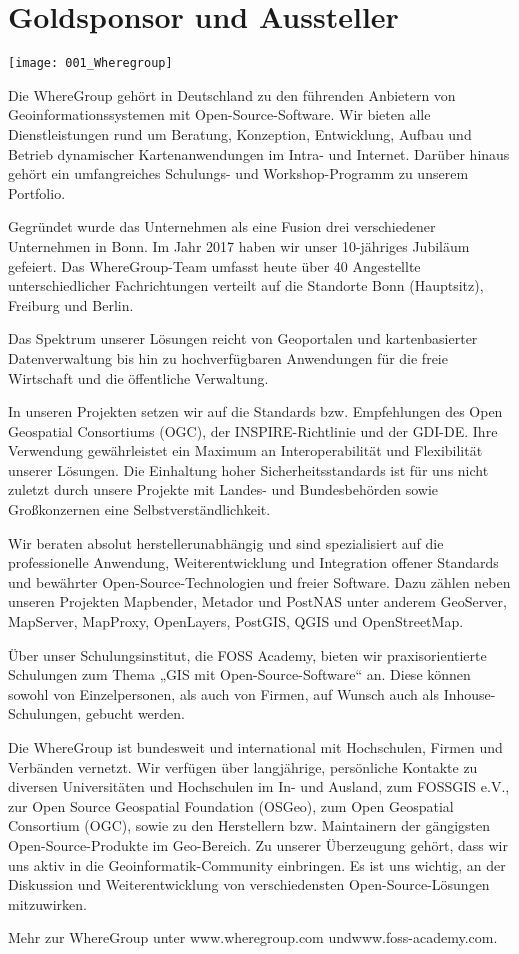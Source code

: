 \section*{Goldsponsor und Aussteller}
\begin{center}
	\texttt{[image: 001\_Wheregroup]}
\end{center}
Die WhereGroup gehört in Deutschland zu den führenden Anbietern von Geoinformationssystemen mit
Open-Source-Software. Wir bieten alle Dienstleistungen rund um Beratung, Konzeption, Entwicklung,
Aufbau und Betrieb dynamischer Kartenanwendungen im Intra- und Internet. Darüber hinaus gehört ein
umfangreiches Schulungs- und Workshop-Programm zu unserem Portfolio.

Gegründet wurde das Unternehmen als eine Fusion drei verschiedener Unternehmen in Bonn. Im Jahr 2017
haben wir unser 10-jähriges Jubiläum gefeiert. Das WhereGroup-Team umfasst heute über 40 Angestellte
unterschiedlicher Fachrichtungen verteilt auf die Standorte Bonn (Hauptsitz), Freiburg und Berlin.

Das Spektrum unserer Lösungen reicht von Geoportalen und kartenbasierter Datenverwaltung bis hin zu
hochverfügbaren Anwendungen für die freie Wirtschaft und die öffentliche Verwaltung.

In unseren Projekten setzen wir auf die Standards bzw. Empfehlungen des Open Geospatial Consortiums
(OGC), der INSPIRE-Richtlinie und der GDI-DE. Ihre Verwendung gewährleistet ein Maximum an
Interoperabilität und Flexibilität unserer Lösungen. Die Einhaltung hoher Sicherheitsstandards ist
für uns nicht zuletzt durch unsere Projekte mit Landes- und Bundesbehörden sowie Großkonzernen eine
Selbstverständlichkeit.

Wir beraten absolut herstellerunabhängig und sind spezialisiert auf die professionelle Anwendung,
Weiterentwicklung und Integration offener Standards und bewährter Open-Source-Tech\-no\-logien und
freier Software. Dazu zählen neben unseren Projekten Mapbender, Metador und PostNAS unter anderem
GeoServer, MapServer, MapProxy, OpenLayers, PostGIS, QGIS und OpenStreetMap.

Über unser Schulungsinstitut, die FOSS Academy, bieten wir praxisorientierte Schulungen zum Thema
„GIS mit Open-Source-Software“ an. Diese können sowohl von Einzelpersonen, als auch von Firmen, auf
Wunsch auch als Inhouse-Schulungen, gebucht werden.

Die WhereGroup ist bundesweit und international mit Hochschulen, Firmen und Verbänden vernetzt. Wir
verfügen über langjährige, persönliche Kontakte zu diversen Universitäten und Hochschulen im In- und
Ausland, zum FOSSGIS e.V., zur Open Source Geospatial Foundation (OSGeo), zum Open Geospatial
Consortium (OGC), sowie zu den Herstellern bzw. Maintainern der gängigsten Open-Source-Produkte im
Geo-Bereich. Zu unserer Überzeugung gehört, dass wir uns aktiv in die Geoinformatik-Community
einbringen. Es ist uns wichtig, an der Diskussion und Weiterentwicklung von verschiedensten
Open-Source-Lösungen mitzuwirken.

Mehr zur WhereGroup unter www.wheregroup.com und\linebreak \mbox{www.foss-academy.com}.
